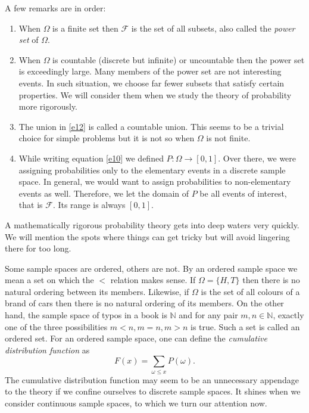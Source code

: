 \documentclass{article}
\begin{document}
A few remarks are in order:
\begin{enumerate}
\item When $\Omega$ is a finite set then $\mathcal{F}$ is the set of all
subsets, also called the \emph{power set} of $\Omega$.
\item When $\Omega$ is countable (discrete but infinite) or uncountable 
then the power set is exceedingly large. Many members of the power set are
not interesting events. In such situation, we choose far fewer subsets 
that satisfy certain properties. We will consider them when we study the
theory of probability more rigorously.
\item The union in \eqref{e12} is called a countable union. This seems to
be a trivial choice for simple problems but it is not so when $\Omega$ is
not finite.
\item While writing equation \eqref{e10} we defined $P: \Omega \rightarrow
[0, 1]$. Over there, we were assigning probabilities only to the elementary
events in a discrete sample space. In general, we would want to assign
probabilities to non-elementary events as well. Therefore, we let the domain
of $P$ be all events of interest, that is $\mathcal{F}$. Its range is 
always $[0, 1]$.
\end{enumerate}

A mathematically rigorous probability theory gets into deep waters very
quickly. We will mention the spots where things can get tricky but will
avoid lingering there for too long.

Some sample spaces are ordered, others are not. By an ordered sample space
we mean a set on which the $<$ relation makes sense. If $\Omega = \{H, T\}$
then there is no natural ordering between its members. Likewise, if 
$\Omega$ is the set of all colours of a brand of cars then there is no
natural ordering of its members. On the other hand, the sample space of
typos in a book is $\mathbb{N}$ and for any pair $m, n \in \mathbb{N}$, 
exactly one of the three possibilities $m < n, m = n, m > n$ is true. Such
a set is called an ordered set. For an ordered sample space, one can 
define the \emph{cumulative distribution function} as
\begin{equation}\label{e13}
F(x) = \sum_{\omega \le x}P(\omega).
\end{equation}
The cumulative distribution function may seem to be an unnecessary 
appendage to the theory if we confine ourselves to discrete sample spaces.
It shines when we consider continuous sample spaces, to which we turn our
attention now.
\end{document}
